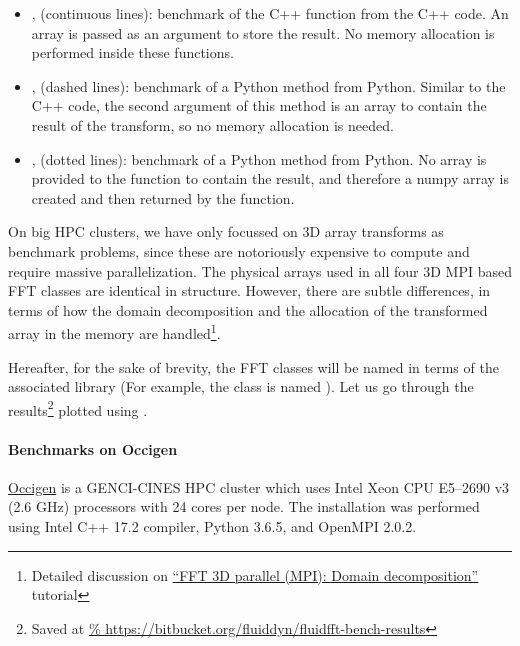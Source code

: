 \documentclass{../jors}
\begin{document}
\begin{itemize}

\item {},  (continuous lines): benchmark
of the C++ function from the C++ code. An array is passed as an argument to store
the result. No memory allocation is performed inside these functions.

\item {},  (dashed lines):
benchmark of a Python method from Python. Similar to the C++ code, the second
argument of this method is an array to contain the result of the transform, so no
memory allocation is needed.

\item {},  (dotted lines):
benchmark of a Python method from Python. No array is provided to the function to
contain the result, and therefore a numpy array is created and then returned by
the function.

\end{itemize}

On big HPC clusters, we have only focussed on 3D array transforms as benchmark
problems, since these are notoriously expensive to compute and require massive
parallelization.  The physical arrays used in all four 3D MPI based FFT classes
are identical in structure.  However, there are subtle differences, in terms of
how the domain decomposition and the allocation of the transformed array in the
memory are handled\footnote{Detailed discussion on \href{%
https://fluidfft.readthedocs.io/en/latest/ipynb/executed/tuto_fft3d_mpi_domain_decomp.html}{%
``FFT 3D parallel (MPI): Domain decomposition''} tutorial}.

Hereafter, for the sake of brevity, the FFT classes will be named in terms of the
associated library (For example, the class  is
named ).  Let us go through the results\footnote{Saved at
\url{%
https://bitbucket.org/fluiddyn/fluidfft-bench-results}} plotted using
.

\paragraph{Benchmarks on Occigen}

\href{https://www.top500.org/system/178465}{Occigen} is a GENCI-CINES HPC
cluster which uses Intel Xeon CPU E5--2690 v3 (2.6 GHz) processors with 24 cores
per node. The installation was performed using Intel C++ 17.2 compiler, Python
3.6.5, and OpenMPI 2.0.2.
\end{document}
